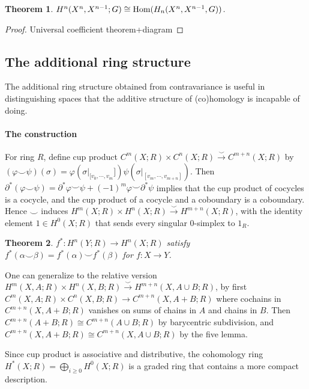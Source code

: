 \documentclass[11pt]{article}
\theoremstyle{definition}
\theoremstyle{plain}
\newtheorem{theorem}{Theorem}[section]
\newcommand{\Hom}{\textup{Hom}}
\newcommand{\1}{\mathbf{1}}
\begin{document}
\begin{theorem}
$H^n(X^n,X^{n-1};G)\cong\Hom(H_n(X^n,X^{n-1},G))$.
\end{theorem}

\begin{proof}
Universal coefficient theorem+diagram
\end{proof}

\newpage
\subsection{The additional ring structure}

The additional ring structure obtained from contravariance is useful in distinguishing spaces that the additive structure of (co)homology is incapable of doing.

\paragraph{The construction} For ring $R$, define cup product $C^m(X;R)\times C^n(X;R)\xrightarrow{\smile} C^{m+n}(X;R)$ by $(\varphi\smile\psi)(\sigma)=\varphi(\sigma|_{[v_0,\cdots,v_m}])\psi(\sigma|_{[v_m,\cdots,v_{m+n}]})$. Then $\partial^\ast(\varphi\smile\psi)=\partial^\ast\varphi\smile\psi+(-1)^m\varphi\smile\partial^\ast\psi$ implies that the cup product of cocycles is a cocycle, and the cup product of a cocycle and a coboundary is a coboundary. Hence $\smile$ induces $H^m(X;R)\times H^n(X;R)\xrightarrow{\smile}H^{m+n}(X;R)$, with the identity element $1\in H^0(X;R)$ that sends every singular $0$-simplex to $1_R$.

\begin{theorem}
$f^\ast:H^n(Y;R)\to H^n(X;R)$ satisfy $f^\ast(\alpha\smile\beta)=f^\ast(\alpha)\smile f^\ast(\beta)$ for $f:X\to Y$.
\end{theorem}

One can generalize to the relative version $H^m(X,A;R)\times H^n(X,B;R)\xrightarrow{\smile}H^{m+n}(X,A\cup B;R)$, by first $C^m(X,A;R)\times C^n(X,B;R)\to C^{m+n}(X,A+B;R)$ where cochains in $C^{m+n}(X,A+B;R)$ vanishes on sums of chains in $A$ and chains in $B$. Then $C^{m+n}(A+B;R)\cong C^{m+n}(A\cup B;R)$ by barycentric subdivision, and $C^{m+n}(X,A+B;R)\cong C^{m+n}(X,A\cup B;R)$ by the five lemma.\medbreak

Since cup product is associative and distributive, the cohomology ring $H^\ast(X;R)=\bigoplus_{i\geq0}H^0(X;R)$ is a graded ring that contains a more compact description.
\end{document}

